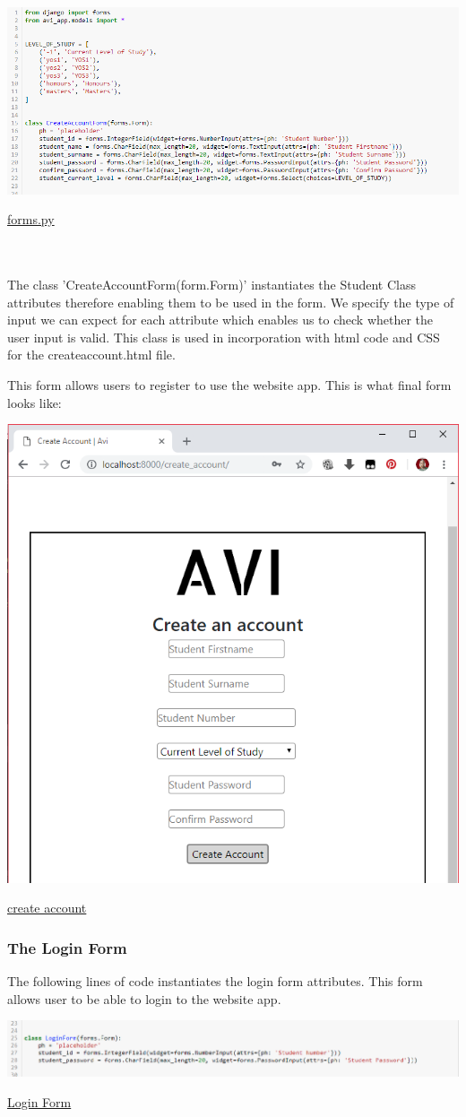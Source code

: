 \documentclass[10pt]{article}
\begin{document}
\begin{center}
\includegraphics[width=.9\textwidth]{forms.png}
\end{center}
\caption{\underline{forms.py}} \\ \\

The class ’CreateAccountForm(form.Form)’ instantiates the Student Class attributes therefore enabling them to be used in the form. We specify the type of input we can expect for each attribute which enables us to check whether the user input is valid. This class is used in incorporation with html code and CSS for the createaccount.html file. 

This form allows users to register to use the website app. This is what final form looks like:

\begin{center}
\includegraphics[width=.4\textwidth]{create_A.png}
\end{center}
\caption{\underline{create account}}

\subsubsection{The Login Form}

The following lines of code instantiates the login form attributes. This form allows user to be able to login to the website app.

\begin{center}
\includegraphics[width=.9\textwidth]{login_form.png}
\end{center}
\caption{\underline{Login Form}} \\ \\
\end{document}

